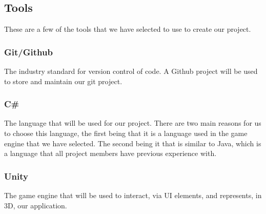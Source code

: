 \subsection{Tools}
These are a few of the tools that we have selected to use to create our project.

\subsubsection{Git/Github}
The industry standard for version control of code. 
A Github project will be used to store and maintain our git project.

\subsubsection{C\#}
The language that will be used for our project. 
There are two main reasons for us to choose this language, the first being that it is a language used in the game engine that we have selected. 
The second being it that is similar to Java, which is a language that all project members have previous experience with.

\subsubsection{Unity}
The game engine that will be used to interact, via UI elements, and represents, in 3D, our application. 